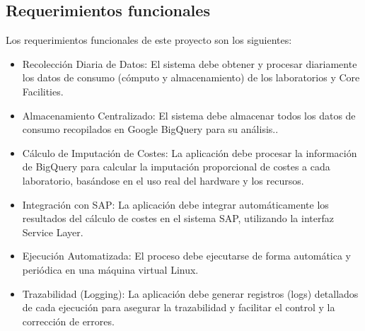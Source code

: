 \subsection{Requerimientos funcionales}
Los requerimientos funcionales de este proyecto son los siguientes:

\begin{itemize}
    \item Recolección Diaria de Datos: El sistema debe obtener y procesar diariamente los datos de consumo (cómputo y almacenamiento) de los laboratorios y Core Facilities.
    \item Almacenamiento Centralizado: El sistema debe almacenar todos los datos de consumo recopilados en Google BigQuery para su análisis..
    \item Cálculo de Imputación de Costes: La aplicación debe procesar la información de BigQuery para calcular la imputación proporcional de costes a cada laboratorio, basándose en el uso real del hardware y los recursos.
    \item Integración con SAP: La aplicación debe integrar automáticamente los resultados del cálculo de costes en el sistema SAP, utilizando la interfaz Service Layer.
    \item Ejecución Automatizada: El proceso debe ejecutarse de forma automática y periódica en una máquina virtual Linux.
    \item Trazabilidad (Logging): La aplicación debe generar registros (logs) detallados de cada ejecución para asegurar la trazabilidad y facilitar el control y la corrección de errores.
\end{itemize}
